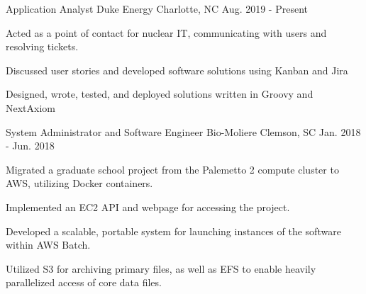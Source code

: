 

\begin{cventries}

  \cventry
    {Application Analyst}
    {Duke Energy}
    {Charlotte, NC}
    {Aug. 2019 - Present}
    {
        \begin{cvitems}
            \item {Acted as a point of contact for nuclear IT, communicating with users and resolving tickets.}
            \item{Discussed user stories and developed software solutions using Kanban and Jira}
            \item{Designed, wrote, tested, and deployed solutions written in Groovy and NextAxiom}
        \end{cvitems}
    }
  \cventry
    {System Administrator and Software Engineer} %
    {Bio-Moliere} %
    {Clemson, SC} %
    {Jan. 2018 - Jun. 2018} %
    {
      \begin{cvitems} %
        \item {Migrated a graduate school project from the Palemetto 2 compute cluster to AWS, utilizing Docker containers.}
        \item {Implemented an EC2 API and webpage for accessing the project.}
        \item {Developed a scalable, portable system for launching instances of the software within AWS Batch.}
        \item {Utilized S3 for archiving primary files, as well as EFS to enable heavily parallelized access of core data files.}
      \end{cvitems}
    }
    

\end{cventries}
